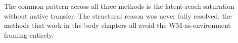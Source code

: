 The common pattern across all three methods is the latent-reach
saturation without native transfer. The structural reason was
never fully resolved; the methods that work in the body chapters
all avoid the WM-as-environment framing entirely.






